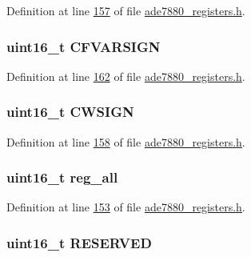 Definition at line \hyperlink{a00036_source_l00157}{157} of file \hyperlink{a00036_source}{ade7880\-\_\-registers.\-h}.

\hypertarget{a00031_a2fc95f0b13f06314a07f0a18b6914fd4}{
\subsubsection[{C\-F\-V\-A\-R\-S\-I\-G\-N}]{\setlength{\rightskip}{0pt plus 5cm}uint16\-\_\-t C\-F\-V\-A\-R\-S\-I\-G\-N}}\label{df/d61/a00031_a2fc95f0b13f06314a07f0a18b6914fd4}


Definition at line \hyperlink{a00036_source_l00162}{162} of file \hyperlink{a00036_source}{ade7880\-\_\-registers.\-h}.

\hypertarget{a00031_a5c90bde24a4e27d631856f8b4524572f}{
\subsubsection[{C\-W\-S\-I\-G\-N}]{\setlength{\rightskip}{0pt plus 5cm}uint16\-\_\-t C\-W\-S\-I\-G\-N}}\label{df/d61/a00031_a5c90bde24a4e27d631856f8b4524572f}


Definition at line \hyperlink{a00036_source_l00158}{158} of file \hyperlink{a00036_source}{ade7880\-\_\-registers.\-h}.

\hypertarget{a00031_a74e4d0cc3da3b66723322f38bfb7f371}{
\subsubsection[{reg\-\_\-all}]{\setlength{\rightskip}{0pt plus 5cm}uint16\-\_\-t reg\-\_\-all}}\label{df/d61/a00031_a74e4d0cc3da3b66723322f38bfb7f371}


Definition at line \hyperlink{a00036_source_l00153}{153} of file \hyperlink{a00036_source}{ade7880\-\_\-registers.\-h}.

\hypertarget{a00031_a9484db76faad15bb8da293c622dd2269}{
\subsubsection[{R\-E\-S\-E\-R\-V\-E\-D}]{\setlength{\rightskip}{0pt plus 5cm}uint16\-\_\-t R\-E\-S\-E\-R\-V\-E\-D}}\label{df/d61/a00031_a9484db76faad15bb8da293c622dd2269}


